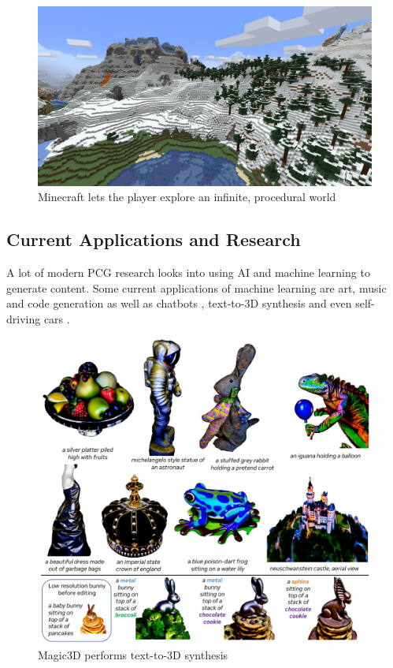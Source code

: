 \begin{figure}[H]
    \centering
    \includegraphics[width=\textwidth, height=0.3\textheight, keepaspectratio]{Images/Minecraft.jpg}
    \caption{Minecraft lets the player explore an infinite, procedural world \cite{minecraft_screenshot}}
    \label{fig:minecraftScreenshot}
\end{figure}

\subsection{Current Applications and Research}
A lot of modern PCG research looks into using AI and machine learning to generate content. Some current applications of machine learning are art, music and code generation as well as chatbots \cite{AIGC_Survey}, text-to-3D synthesis \cite{Magic3D} and even self-driving cars \cite{Self_Driving_Cars}.

\begin{figure}[H]
    \centering
    \includegraphics[width=\textwidth, height=0.5\textheight, keepaspectratio]{Images/Magic3D.jpg}
    \caption{Magic3D performs text-to-3D synthesis \cite{Magic3D}}
    \label{fig:magic3D}
\end{figure}

